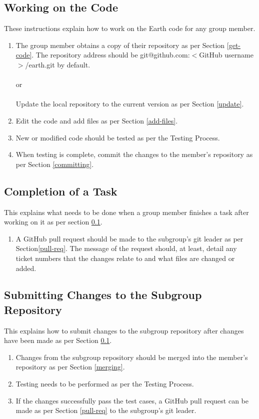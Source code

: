 \documentclass{article}
\begin{document}
\subsection{Working on the Code}
\label{working}
These instructions explain how to work on the Earth code for any group member.
\begin{enumerate}
	\item The group member obtains a copy of their repository as per Section \ref{get-code}. The repository address should be git@github.com:\(<\)GitHub username\(>\)/earth.git by default.\\
	\\
	or\\
	\\
	Update the local repository to the current version as per Section \ref{update}.
	\item Edit the code and add files as per Section \ref{add-files}.
	\item New or modified code should be tested as per the Testing Process.
	\item When testing is complete, commit the changes to the member's repository as per Section \ref{committing}.
\end{enumerate}

\subsection{Completion of a Task}
This explains what needs to be done when a group member finishes a task after working on it as per section \ref{working}.
\begin{enumerate}
	\item A GitHub pull request should be made to the subgroup's git leader as per Section\ref{pull-req}. The message of the request should, at least, detail any ticket numbers that the changes relate to and what files are changed or added.
\end{enumerate}

\subsection{Submitting Changes to the Subgroup Repository}
This explains how to submit changes to the subgroup repository after changes have been made as per Section \ref{working}.
\begin{enumerate}
	\item Changes from the subgroup repository should be merged into the member's repository as per Section \ref{merging}.
	\item Testing needs to be performed as per the Testing Process.
	\item If the changes successfully pass the test cases, a GitHub pull request can be made as per Section \ref{pull-req} to the subgroup's git leader.
\end{enumerate}
\end{document}
